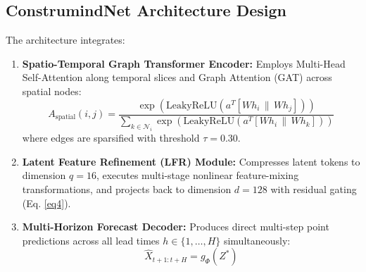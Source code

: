 \documentclass[pdflatex,sn-mathphys,Numbered]{sn-jnl}%
\begin{document}
\subsection{ConstrumindNet Architecture Design}
The architecture integrates:
\begin{enumerate}
\item \textbf{Spatio-Temporal Graph Transformer Encoder:} Employs Multi-Head Self-Attention along temporal slices and Graph Attention (GAT) across spatial nodes:
\begin{equation}
A_{\text{spatial}}(i, j) = \frac{\exp\left(\text{LeakyReLU}\left(a^T [W h_i \,\|\, W h_j]\right)\right)}{\sum_{k \in \mathcal{N}_i} \exp\left(\text{LeakyReLU}\left(a^T [W h_i \,\|\, W h_k]\right)\right)} \label{eq7}
\end{equation}
where edges are sparsified with threshold $\tau = 0.30$.
\item \textbf{Latent Feature Refinement (LFR) Module:} Compresses latent tokens to dimension $q = 16$, executes multi-stage nonlinear feature-mixing transformations, and projects back to dimension $d = 128$ with residual gating (Eq. \ref{eq4}).
\item \textbf{Multi-Horizon Forecast Decoder:} Produces direct multi-step point predictions across all lead times $h \in \{1, \dots, H\}$ simultaneously:
\begin{equation}
\widehat{X}_{t+1:t+H} = g_\Phi(Z^*) \label{eq8}
\end{equation}
\end{enumerate}
\end{document}
